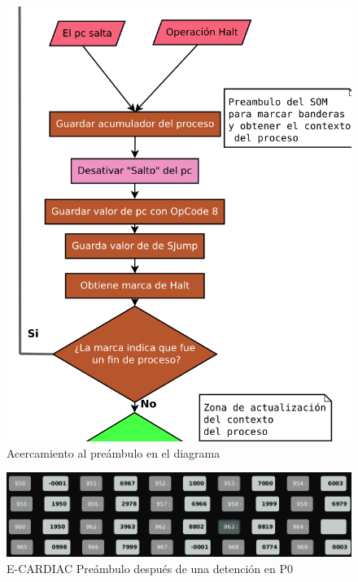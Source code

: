 \documentclass[letterpaper,12pt,oneside]{book}
\begin{document}
		
		
		\begin{figure}[h]		
			\centering
			\includegraphics[scale=0.4]{media/CARDIACC/diagPreambulo.png}
			\caption{Acercamiento al preámbulo en el diagrama}
			\label{fig:diagZoomPreambulo}
		\end{figure}
		
		\begin{figure}[h]		
			\centering
			\includegraphics[scale=0.4]{media/CARDIACC/eccPreambuloHaltOpP0.png}
			\caption{ E-CARDIAC Preámbulo después de una detención en P0}
			\label{fig:eccPreamHaltP0}
		\end{figure}
		
\end{document}
